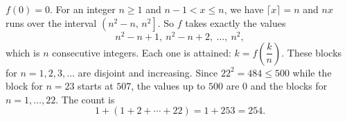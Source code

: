 $f(0)=0$. For an integer $n\ge1$ and $n-1<x\le n$, we have $\lceil x\rceil=n$ and $nx$ runs over the interval $\left(n^2-n,\,n^2\right]$. So $f$ takes exactly the values
\[n^2-n+1,\ n^2-n+2,\ \dots,\ n^2,\]
which is $n$ consecutive integers. Each one is attained: $k=f\left(\dfrac kn\right)$. These blocks for $n=1,2,3,\dots$ are disjoint and increasing. Since $22^2=484\le500$ while the block for $n=23$ starts at $507$, the values up to $500$ are $0$ and the blocks for $n=1,\dots,22$. The count is
\[1+(1+2+\cdots+22)=1+253=\boxed{254}.\]

